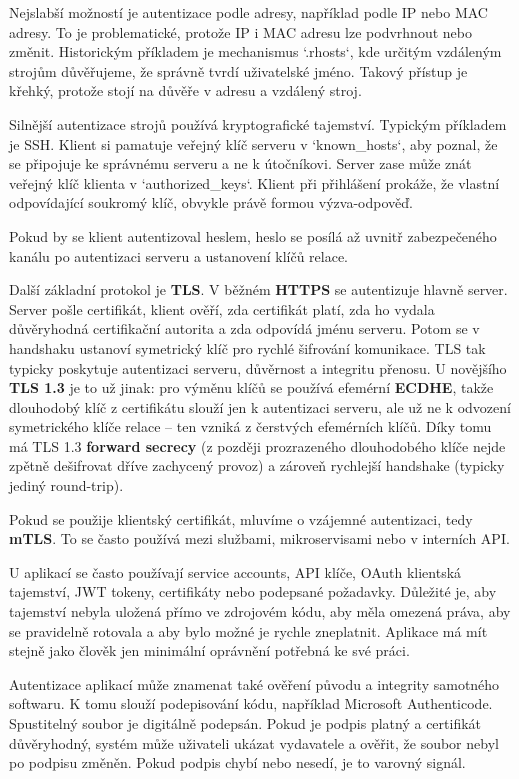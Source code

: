 Nejslabší možností je autentizace podle adresy, například podle IP nebo MAC adresy. To je problematické, protože IP i MAC adresu lze podvrhnout nebo změnit. Historickým příkladem je mechanismus `.rhosts`, kde určitým vzdáleným strojům důvěřujeme, že správně tvrdí uživatelské jméno. Takový přístup je křehký, protože stojí na důvěře v adresu a vzdálený stroj.

Silnější autentizace strojů používá kryptografické tajemství. Typickým příkladem je SSH. Klient si pamatuje veřejný klíč serveru v `known\_hosts`, aby poznal, že se připojuje ke správnému serveru a ne k útočníkovi. Server zase může znát veřejný klíč klienta v `authorized\_keys`. Klient při přihlášení prokáže, že vlastní odpovídající soukromý klíč, obvykle právě formou výzva-odpověď.

Pokud by se klient autentizoval heslem, heslo se posílá až uvnitř zabezpečeného kanálu po autentizaci serveru a ustanovení klíčů relace.

Další základní protokol je \textbf{TLS}. V běžném \textbf{HTTPS} se autentizuje hlavně server. Server pošle certifikát, klient ověří, zda certifikát platí, zda ho vydala důvěryhodná certifikační autorita a zda odpovídá jménu serveru. Potom se v handshaku ustanoví symetrický klíč pro rychlé šifrování komunikace. TLS tak typicky poskytuje autentizaci serveru, důvěrnost a integritu přenosu. U novějšího \textbf{TLS 1.3} je to už jinak: pro výměnu klíčů se používá efemérní \textbf{ECDHE}, takže dlouhodobý klíč z certifikátu slouží jen k autentizaci serveru, ale už ne k odvození symetrického klíče relace -- ten vzniká z čerstvých efemérních klíčů. Díky tomu má TLS 1.3 \textbf{forward secrecy} (z později prozrazeného dlouhodobého klíče nejde zpětně dešifrovat dříve zachycený provoz) a zároveň rychlejší handshake (typicky jediný round-trip).

Pokud se použije klientský certifikát, mluvíme o vzájemné autentizaci, tedy \textbf{mTLS}. To se často používá mezi službami, mikroservisami nebo v interních API.

U aplikací se často používají service accounts, API klíče, OAuth klientská tajemství, JWT tokeny, certifikáty nebo podepsané požadavky. Důležité je, aby tajemství nebyla uložená přímo ve zdrojovém kódu, aby měla omezená práva, aby se pravidelně rotovala a aby bylo možné je rychle zneplatnit. Aplikace má mít stejně jako člověk jen minimální oprávnění potřebná ke své práci.

Autentizace aplikací může znamenat také ověření původu a integrity samotného softwaru. K tomu slouží podepisování kódu, například Microsoft Authenticode. Spustitelný soubor je digitálně podepsán. Pokud je podpis platný a certifikát důvěryhodný, systém může uživateli ukázat vydavatele a ověřit, že soubor nebyl po podpisu změněn. Pokud podpis chybí nebo nesedí, je to varovný signál.

